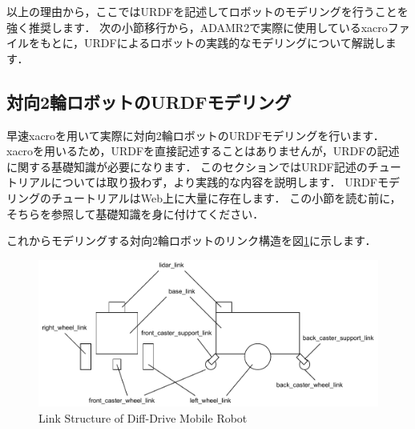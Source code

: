 \documentclass[{../../master}]{subfiles}
\begin{document}
以上の理由から，ここではURDFを記述してロボットのモデリングを行うことを強く推奨します．
次の小節移行から，ADAMR2で実際に使用している\textsf{xacro}ファイルをもとに，URDFによるロボットの実践的なモデリングについて解説します．

\subsection{対向2輪ロボットのURDFモデリング}

早速\textsf{xacro}を用いて実際に対向2輪ロボットのURDFモデリングを行います．
\textsf{xacro}を用いるため，URDFを直接記述することはありませんが，URDFの記述に関する基礎知識が必要になります．
このセクションではURDF記述のチュートリアルについては取り扱わず，より実践的な内容を説明します．
URDFモデリングのチュートリアルはWeb上に大量に存在します．
この小節を読む前に，そちらを参照して基礎知識を身に付けてください．

これからモデリングする対向2輪ロボットのリンク構造を図\ref{fig:mobile_robot_structure}に示します．

\begin{figure}[ht]
  \centering
  \includegraphics[width=100truemm, clip]{images/mobile_robot_structure.pdf}
  \caption{Link Structure of Diff-Drive Mobile Robot}
  \label{fig:mobile_robot_structure}
\end{figure}
\end{document}
